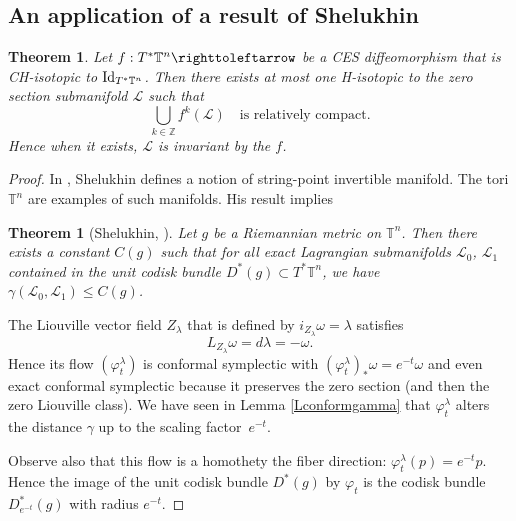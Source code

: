 \documentclass[10pt]{amsart}
\newtheorem{theorem}{Theorem}
\newtheorem*{theorem*}{Theorem}
\theoremstyle{definition}
\def\Z{\mathbb{Z}}
\def\T{\mathbb{T}}
\def\cL{{\mathcal L}}
\let\Subsection\subsection\let\Subsubsection\subsubsection
\begin{document}
\Subsection{An application of a result of Shelukhin}

\begin{theorem}
Let $f:T^*\T^n \righttoleftarrow$ be a CES diffeomorphism that is CH-isotopic to ${\rm Id}_{T^*\T^n}$. Then there exists at most one H-isotopic to the zero section submanifold $\cL$ such that
\[
\bigcup_{k\in\Z}f^k(\cL)\quad\text{is relatively compact}.
\]
Hence when it exists, $\cL$ is invariant by the $f$.
\end{theorem}

\begin{proof}
In \cite{Shel2020}, Shelukhin defines a notion of string-point invertible manifold. The tori $\T^n$ are examples of such manifolds. His result implies
\begin{theorem*}[Shelukhin, \cite{Shel2020}] Let $g$ be a Riemannian metric
on $\T^n$. Then there exists a constant $C(g)$ such that for all exact Lagrangian submanifolds
$\cL_0$, $\cL_1$ contained in the unit codisk bundle $D^*(g)\subset T^*\T^n$, we have
$\gamma (\cL_0, \cL_1) \leq C(g)$.
\end{theorem*}

The Liouville vector field $Z_\lambda$ that is defined by $i_{Z_\lambda}\omega=\lambda$ satisfies
\[
L_{Z_\lambda}\omega=d\lambda=-\omega.
\]
Hence its flow $(\varphi^\lambda_t)$ is conformal symplectic with $(\varphi^\lambda_{t})_*\omega=e^{-t}\omega$ and even exact conformal symplectic because it preserves the zero section (and then the zero Liouville class). We have seen in Lemma \ref{Lconformgamma} that $\varphi^\lambda_t$ alters the distance $\gamma$ up to the scaling factor~$e^{-t}$.

Observe also that this flow is a homothety the fiber direction: $\varphi^\lambda_t(p)=e^{-t}p$. Hence the image of the unit codisk bundle $D^*(g)$ by $\varphi_t$ is the codisk bundle $D_{e^{-t}}^*(g)$ with radius $e^{-t}$.


\end{proof}
\end{document}
